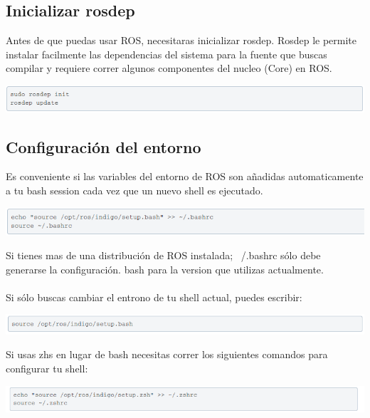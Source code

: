 \documentclass[a4paper,usenames,dvipsnames,svgnames,table]{book}
\begin{document}
\subsection{Inicializar rosdep}
Antes de que puedas usar ROS, necesitaras inicializar rosdep. Rosdep le permite instalar facilmente las dependencias 
del sistema para la fuente que buscas compilar y requiere correr algunos componentes del nucleo (Core) en ROS.

\begin{center}
\includegraphics[width=1\textwidth]{Figures/Software/Install_ROS/Paso_13.png}
\end{center}

\subsection{Configuración del entorno}

Es conveniente si las variables del entorno de ROS son añadidas automaticamente a tu bash session cada vez que un 
nuevo shell es ejecutado. 

\begin{center}
\includegraphics[width=1\textwidth]{Figures/Software/Install_ROS/Paso_14.png}
\end{center}

Si tienes mas de una distribución de ROS instalada; ~/.bashrc sólo debe generarse la configuración. bash para 
la version que utilizas actualmente.\\
\\
Si sólo buscas cambiar el entrono de tu shell actual, puedes escribir:

\begin{center}
\includegraphics[width=1\textwidth]{Figures/Software/Install_ROS/Paso_15.png}
\end{center}

Si usas zhs en lugar de bash necesitas correr los siguientes comandos para configurar tu shell:

\begin{center}
\includegraphics[width=1\textwidth]{Figures/Software/Install_ROS/Paso_16.png}
\end{center}
\end{document}
